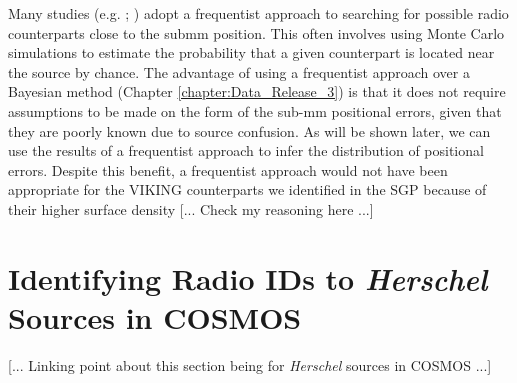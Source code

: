 Many studies (e.g. \citealt{Eales_2009}; \citealt{Dye_2009}) adopt a frequentist approach to searching for possible radio counterparts close to the submm position. This often involves using Monte Carlo simulations to estimate the probability that a given counterpart is located near the source by chance. The advantage of using a frequentist approach over a Bayesian method (Chapter \ref{chapter:Data_Release_3}) is that it does not require assumptions to be made on the form of the sub-mm positional errors, given that they are poorly known due to source confusion. As will be shown later, we can use the results of a frequentist approach to infer the distribution of positional errors. Despite this benefit, a frequentist approach would not have been appropriate for the VIKING counterparts we identified in the SGP because of their higher surface density {\color{red}[... Check my reasoning here ...]} 

\section{Identifying Radio IDs to \textit{Herschel} Sources in COSMOS}

[... Linking point about this section being for \textit{Herschel} sources in COSMOS ...]